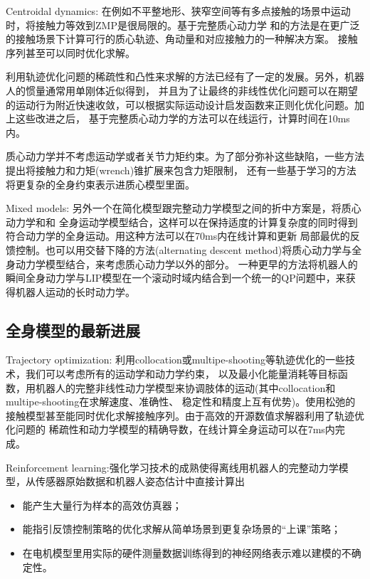 Centroidal dynamics: 在例如不平整地形、狭窄空间等有多点接触的场景中运动时，将接触力等效到ZMP是很局限的。基于完整质心动力学
和的方法是在更广泛的接触场景下计算可行的质心轨迹、角动量和对应接触力的一种解决方案。
接触序列甚至可以同时优化求解\cite{winkler2018gait}。

利用轨迹优化问题的稀疏性和凸性来求解的方法已经有了一定的发展\cite{ponton2016convex,tonneau2018efficient}。另外，机器人的惯量通常用单刚体近似得到\cite{mastalli2017trajectory,winkler2018gait}，
并且为了让最终的非线性优化问题可以在期望的运动行为附近快速收敛，可以根据实际运动设计启发函数来正则化优化问题\cite{bledt2020extracting}。加上这些改进之后，
基于完整质心动力学的方法可以在线运行，计算时间在10ms内\cite{bledt2019implementing}。

质心动力学并不考虑运动学或者关节力矩约束。为了部分弥补这些缺陷，一些方法提出将接触力和力矩(wrench)锥扩展来包含力矩限制\cite{orsolino2020feasible}，
还有一些基于学习的方法将更复杂的全身约束表示进质心模型里面\cite{carpentier2018multicontact}。

Mixed models: 另外一个在简化模型跟完整动力学模型之间的折中方案是，将质心动力学和和
全身运动学模型结合，这样可以在保持适度的计算复杂度的同时得到符合动力学的全身运动\cite{dai2014whole}。用这种方法可以在70ms内在线计算和更新
局部最优的反馈控制。也可以用交替下降的方法(alternating descent method)将质心动力学与全身动力学模型结合，来考虑质心动力学以外的部分\cite{budhiraja2019dynamics}。
一种更早的方法将机器人的瞬间全身动力学与LIP模型在一个滚动时域内结合到一个统一的QP问题中，来获得机器人运动的长时动力学。

\subsection{全身模型的最新进展}
Trajectory optimization: 利用collocation\cite{posa2016optimization}或multipe-shooting\cite{koch2014optimization}等轨迹优化的一些技术，我们可以考虑所有的运动学和动力学约束，
以及最小化能量消耗等目标函数，用机器人的完整非线性动力学模型来协调肢体的运动(其中collocation和multipe-shooting在求解速度、准确性、
稳定性和精度上互有优势\cite{diehl2006fast})。使用松弛的接触模型甚至能同时优化求解接触序列\cite{posa2014direct}。由于高效的开源数值求解器利用了轨迹优化问题的
稀疏性和动力学模型的精确导数，在线计算全身运动可以在7ms内完成\cite{neunert2018whole}。

Reinforcement learning:强化学习技术的成熟使得离线用机器人的完整动力学模型，从传感器原始数据和机器人姿态估计中直接计算出
\begin{itemize}
\item 能产生大量行为样本的高效仿真器\cite{hwangbo2018per}；
\item 能指引反馈控制策略的优化求解从简单场景到更复杂场景的“上课”策略；
\item 在电机模型里用实际的硬件测量数据训练得到的神经网络表示难以建模的不确定性。
\end{itemize}

